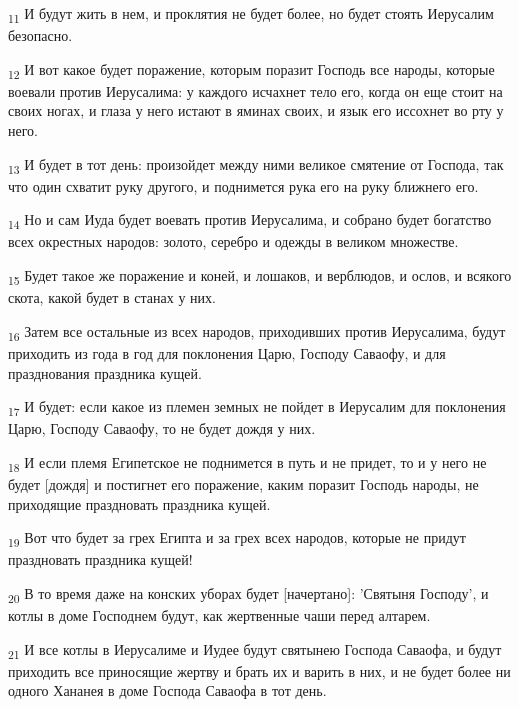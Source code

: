 \begin{tcolorbox}
\textsubscript{11} И будут жить в нем, и проклятия не будет более, но будет стоять Иерусалим безопасно.
\end{tcolorbox}
\begin{tcolorbox}
\textsubscript{12} И вот какое будет поражение, которым поразит Господь все народы, которые воевали против Иерусалима: у каждого исчахнет тело его, когда он еще стоит на своих ногах, и глаза у него истают в яминах своих, и язык его иссохнет во рту у него.
\end{tcolorbox}
\begin{tcolorbox}
\textsubscript{13} И будет в тот день: произойдет между ними великое смятение от Господа, так что один схватит руку другого, и поднимется рука его на руку ближнего его.
\end{tcolorbox}
\begin{tcolorbox}
\textsubscript{14} Но и сам Иуда будет воевать против Иерусалима, и собрано будет богатство всех окрестных народов: золото, серебро и одежды в великом множестве.
\end{tcolorbox}
\begin{tcolorbox}
\textsubscript{15} Будет такое же поражение и коней, и лошаков, и верблюдов, и ослов, и всякого скота, какой будет в станах у них.
\end{tcolorbox}
\begin{tcolorbox}
\textsubscript{16} Затем все остальные из всех народов, приходивших против Иерусалима, будут приходить из года в год для поклонения Царю, Господу Саваофу, и для празднования праздника кущей.
\end{tcolorbox}
\begin{tcolorbox}
\textsubscript{17} И будет: если какое из племен земных не пойдет в Иерусалим для поклонения Царю, Господу Саваофу, то не будет дождя у них.
\end{tcolorbox}
\begin{tcolorbox}
\textsubscript{18} И если племя Египетское не поднимется в путь и не придет, то и у него не будет [дождя] и постигнет его поражение, каким поразит Господь народы, не приходящие праздновать праздника кущей.
\end{tcolorbox}
\begin{tcolorbox}
\textsubscript{19} Вот что будет за грех Египта и за грех всех народов, которые не придут праздновать праздника кущей!
\end{tcolorbox}
\begin{tcolorbox}
\textsubscript{20} В то время даже на конских уборах будет [начертано]: 'Святыня Господу', и котлы в доме Господнем будут, как жертвенные чаши перед алтарем.
\end{tcolorbox}
\begin{tcolorbox}
\textsubscript{21} И все котлы в Иерусалиме и Иудее будут святынею Господа Саваофа, и будут приходить все приносящие жертву и брать их и варить в них, и не будет более ни одного Хананея в доме Господа Саваофа в тот день.
\end{tcolorbox}
